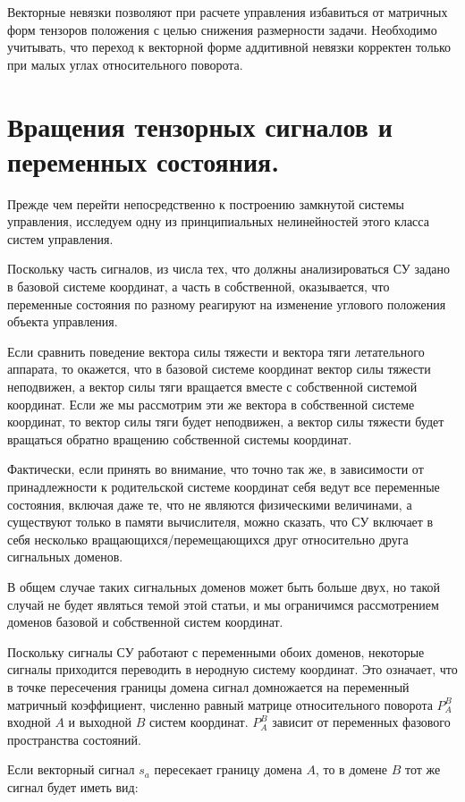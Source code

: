 \documentclass[a4paper]{article}
\begin{document}
Векторные невязки позволяют при расчете управления избавиться от матричных форм тензоров положения с целью снижения размерности задачи. Необходимо учитывать, что переход к векторной форме аддитивной невязки корректен только при малых углах относительного поворота.

\section{Вращения тензорных сигналов и переменных состояния.}
Прежде чем перейти непосредственно к построению замкнутой системы управления, исследуем одну из принципиальных нелинейностей этого класса систем управления.

Поскольку часть сигналов, из числа тех, что должны анализироваться СУ задано в базовой системе координат, а часть в собственной, оказывается, что переменные состояния по разному реагируют на изменение углового положения объекта управления. 

Если сравнить поведение вектора силы тяжести и вектора тяги летательного аппарата, то окажется, что в базовой системе координат вектор силы тяжести неподвижен, а вектор силы тяги вращается вместе с собственной системой координат. Если же мы рассмотрим эти же вектора в собственной системе координат, то вектор силы тяги будет неподвижен, а вектор силы тяжести будет вращаться обратно вращению собственной системы координат.

Фактически, если принять во внимание, что точно так же, в зависимости от принадлежности к родительской системе координат себя ведут все переменные состояния, включая даже те, что не являются физическими величинами, а существуют только в памяти вычислителя, можно сказать, что СУ включает в себя несколько вращающихся/перемещающихся друг относительно друга сигнальных доменов.

В общем случае таких сигнальных доменов может быть больше двух, но такой случай не будет являться темой этой статьи, и мы ограничимся рассмотрением доменов базовой и собственной систем координат. 

Поскольку сигналы СУ работают с переменными обоих доменов, некоторые сигналы приходится переводить в неродную систему координат. Это означает, что в точке пересечения границы домена сигнал домножается на переменный матричный коэффициент, численно равный матрице относительного поворота $P_A^B$ входной $A$ и выходной $B$ систем координат. $P_A^B$ зависит от переменных фазового пространства состояний.

Если векторный сигнал $s_a$ пересекает границу домена $A$, то в домене $B$ тот же сигнал будет иметь вид:
\end{document}
